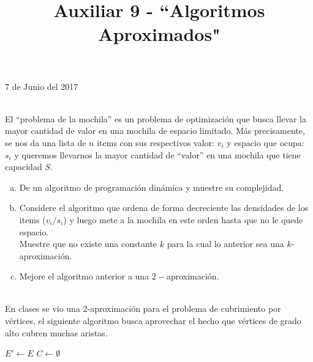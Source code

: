 \documentclass[dcc,uchile]{fcfmcourse}
\title{Auxiliar 9 - ``Algoritmos Aproximados"}
\begin{document}
\maketitle
\begin{center}
7 de Junio del 2017
\end{center}
\vspace{-1ex}


\begin{problems}
\\
El ``problema de la mochila'' es un problema de optimización que busca llevar la mayor cantidad de valor en una mochila de espacio limitado. Más precisamente, se nos da una lista de $n$ items con sus respectivos valor: $v_{i}$ y espacio que ocupa: $s_{i}$ y queremos llevarnos la mayor cantidad de ``valor'' en una mochila que tiene capacidad $S$.
\begin{enumerate}[a)]
    \item De un algoritmo de programación dinámica y muestre su complejidad.
    \item Considere el algoritmo que ordena de forma decreciente las densidades de los items ($v_{i}/s_{i}$) y luego mete a la mochila en este orden hasta que no le quede espacio.\\ Muestre que no existe una constante $k$ para la cual lo anterior sea una $k$-aproximación.
    \item Mejore el algoritmo anterior a una $2-$aproximación.
\end{enumerate}

\\
En clases se vio una 2-aproximación para el problema de cubrimiento por vértices, el siguiente algoritmo busca aprovechar el hecho que vértices de grado alto cubren muchas aristas.
\begin{algorithm}[H]


\SetAlgoLined
{}
 $E'\gets E$\;
 $C\gets \emptyset$\;
 

\end{algorithm}
\end{problems}
\end{document}

